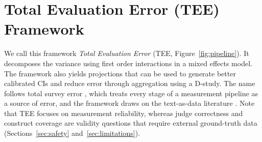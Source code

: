 \documentclass{article}
\begin{document}
\section{Total Evaluation Error (TEE) Framework}
\label{sec:framework}

We call this framework \textit{Total Evaluation Error} (TEE, Figure~\ref{fig:pipeline}). It decomposes the variance using first order interactions in a mixed effects model. The framework also yields projections that can be used to generate better calibrated CIs and reduce error through aggregation using a D-study. The name follows total survey error \citep{sen2019tedon, groves2010survey}, which treats every stage of a measurement pipeline as a source of error, and the framework draws on the text-as-data literature \citep{grimmer2013text}. Note that TEE focuses on measurement reliability, whereas judge correctness and construct coverage are validity questions that require external ground-truth data (Sections~\ref{sec:safety} and~\ref{sec:limitations}). %
\end{document}
